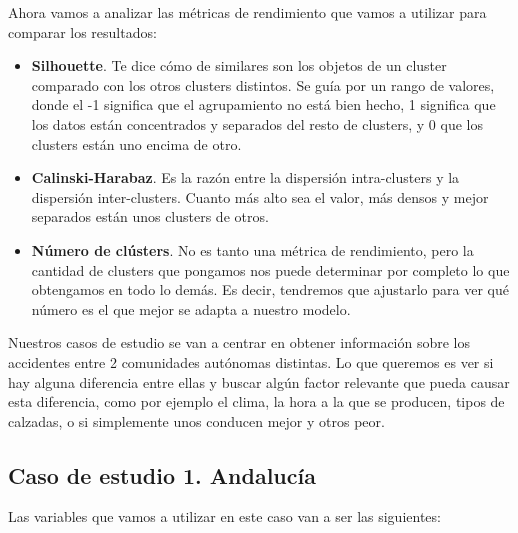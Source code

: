 \documentclass[11pt,a4paper]{article}
\begin{document}
Ahora vamos a analizar las métricas de rendimiento que vamos a utilizar para comparar los resultados:

\begin{itemize}
    \item \textbf{Silhouette}. Te dice cómo de similares son los objetos de un cluster comparado con los otros clusters distintos.
          Se guía por un rango de valores, donde el -1 significa que el agrupamiento no está bien hecho, 1 significa que los datos
          están concentrados y separados del resto de clusters, y 0 que los clusters están uno encima de otro.
    \item \textbf{Calinski-Harabaz}. Es la razón entre la dispersión intra-clusters y la dispersión inter-clusters. Cuanto más alto
          sea el valor, más densos y mejor separados están unos clusters de otros.
    \item \textbf{Número de clústers}. No es tanto una métrica de rendimiento, pero la cantidad de clusters que pongamos nos puede
          determinar por completo lo que obtengamos en todo lo demás. Es decir, tendremos que ajustarlo para ver qué número es el
          que mejor se adapta a nuestro modelo.
\end{itemize}

Nuestros casos de estudio se van a centrar en obtener información sobre los accidentes entre 2 comunidades autónomas distintas. Lo
que queremos es ver si hay alguna diferencia entre ellas y buscar algún factor relevante que pueda causar esta diferencia, como por
ejemplo el clima, la hora a la que se producen, tipos de calzadas, o si simplemente unos conducen mejor y otros peor.


\subsection{Caso de estudio 1. Andalucía}

Las variables que vamos a utilizar en este caso van a ser las siguientes:
\end{document}
